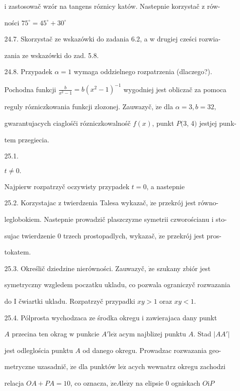 \documentclass[a4paper,12pt]{article}
\begin{document}
$\mathrm{i}$ zastosowač wzór na tangens róznicy katów. Nastepnie korzystač $\mathrm{z}$ rów-

ności $75^{\circ}=45^{\circ}+30^{\circ}$

24.7. Skorzystač ze wskazówki do zadania 6.2, a w drugiej cześci rozwia-

zania ze wskazówki do zad. 5.8.

24.8. Przypadek $\alpha=1$ wymaga oddzielnego rozpatrzenia (dlaczego?).

Pochodna funkcji $\displaystyle \frac{b}{x^{2}-1}=b(x^{2}-1)^{-1}$ wygodniej jest obliczač za pomoca

reguly rózniczkowania funkcji zlozonej. Zauwazyč, $\dot{\mathrm{z}}\mathrm{e}$ dla $\alpha= 3, b= 32,$

gwarantujacych ciaglośči rózniczkowalnośč $f(x)$, punkt $P(3$, 4$)$ jestjej punk-

tem przegiecia.

25.1.

$t\neq 0.$

Najpierw rozpatrzyč oczywisty przypadek $t = 0$, a nastepnie

25.2. Korzystajac $\mathrm{z}$ twierdzenia Talesa wykazač, $\dot{\mathrm{z}}\mathrm{e}$ przekrój jest równo-

leglobokiem. Nastepnie prowadzič plaszczyzne symetrii czworościanu $\mathrm{i}$ sto-

sujac twierdzenie $0$ trzech prostopadlych, wykazač, $\dot{\mathrm{z}}\mathrm{e}$ przekrój jest pros-

tokatem.

25.3. Określič dziedzine nierówności. Zauwazyč, $\dot{\mathrm{z}}\mathrm{e}$ szukany zbiór jest

symetryczny wzgledem poczatku ukladu, co pozwala ograniczyč rozwazania

do I čwiartki ukladu. Rozpatrzyč przypadki $xy>1$ oraz $xy<1.$

25.4. Pólprosta wychodzaca ze środka okregu $\mathrm{i}$ zawierajaca dany punkt

$A$ przecina ten okrag $\mathrm{w}$ punkcie $A'\mathrm{l}\mathrm{e}\dot{\mathrm{z}}$ acym najblizej punktu $A$. Stad $|AA'|$

jest odleglościa punktu $A$ od danego okregu. Prowadzac rozwazania geo-

metryczne uzasadnič, $\dot{\mathrm{z}}\mathrm{e}$ dla punktów $\mathrm{l}\mathrm{e}\dot{\mathrm{z}}$ acych wewnatrz okregu zachodzi

relacja $OA+PA=10$, co oznacza, $\dot{\mathrm{z}}\mathrm{e}A\mathrm{l}\mathrm{e}\dot{\mathrm{z}}\mathrm{y}$ na elipsie $0$ ogniskach $O\mathrm{i}P$
\end{document}
